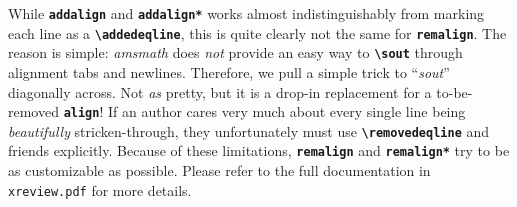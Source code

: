 \documentclass[10pt]{article}
\newcommand{\writecommand}[1]{\texttt{\textbf{{\textbackslash#1}}}}
\newcommand{\writeenv}[1]{\texttt{\textbf{{#1}}}}
\begin{document}
While \writeenv{addalign} and \writeenv{addalign*} works almost indistinguishably from marking each line as a \writecommand{addedeqline}, this is quite clearly not the same for \writeenv{remalign}. The reason is simple: \textit{amsmath} does \textit{not} provide an easy way to \writecommand{sout} through alignment tabs and newlines. Therefore, we pull a simple trick to ``\textit{sout}'' diagonally across. Not \textit{as} pretty, but it is a drop-in replacement for a to-be-removed \writeenv{align}! If an author cares very much about every single line being \textit{beautifully} stricken-through, they unfortunately must use \writecommand{removedeqline} and friends explicitly. Because of these limitations, \writeenv{remalign} and \writeenv{remalign*} try to be as customizable as possible. Please refer to the full documentation in \texttt{xreview.pdf} for more details.
\end{document}
